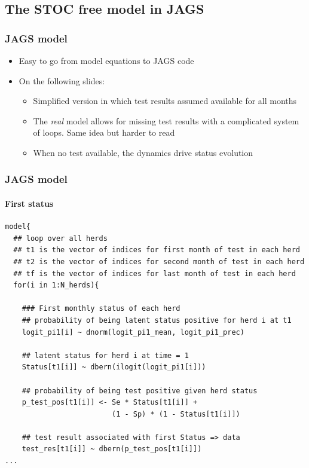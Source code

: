 \documentclass{beamer}
\begin{document}
\subsection[JAGS]{The STOC free model in JAGS}

\begin{frame}
\frametitle{JAGS model}
\begin{itemize}
 \item{Easy to go from model equations to JAGS code}
 \item{On the following slides:}
 \begin{itemize}
  \item{Simplified version in which test results assumed available for all months}
  \item{The \emph{real} model allows for missing test results with a complicated system of loops. Same idea but harder to read}
  \item{When no test available, the dynamics drive status evolution}
 \end{itemize}
\end{itemize}
\end{frame}

\begin{frame}[fragile]
\frametitle{JAGS model}
\framesubtitle{First status}
\scriptsize
\begin{verbatim}
model{
  ## loop over all herds
  ## t1 is the vector of indices for first month of test in each herd
  ## t2 is the vector of indices for second month of test in each herd
  ## tf is the vector of indices for last month of test in each herd
  for(i in 1:N_herds){
    
    ### First monthly status of each herd
    ## probability of being latent status positive for herd i at t1
    logit_pi1[i] ~ dnorm(logit_pi1_mean, logit_pi1_prec)
    
    ## latent status for herd i at time = 1
    Status[t1[i]] ~ dbern(ilogit(logit_pi1[i]))
  
    ## probability of being test positive given herd status
    p_test_pos[t1[i]] <- Se * Status[t1[i]] + 
                         (1 - Sp) * (1 - Status[t1[i]])
    
    ## test result associated with first Status => data
    test_res[t1[i]] ~ dbern(p_test_pos[t1[i]])
...    
\end{verbatim}
\end{frame}
\end{document}
